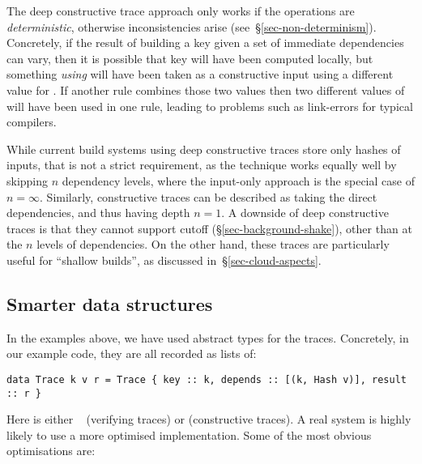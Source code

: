 The deep constructive trace approach only works if the operations are
\emph{deterministic}, otherwise inconsistencies arise
(see~\S\ref{sec-non-determinism}). Concretely, if the result of building a key
given a set of immediate dependencies can vary, then it is possible that key
 will have been computed locally, but something \emph{using}  will
have been taken as a constructive input using a different value for . If
another rule combines those two values then two different values of  will
have been used in one rule, leading to problems such as link-errors for typical
compilers.

While current build systems using deep constructive traces store only hashes of
inputs, that is not a strict requirement, as the technique works equally well by
skipping $n$ dependency levels, where the input-only approach is the special
case of $n = \infty$. Similarly, constructive traces can be described as taking
the direct dependencies, and thus having depth $n = 1$. A downside of deep
constructive traces is that they cannot support cutoff
(\S\ref{sec-background-shake}), other than at the $n$ levels of dependencies. On
the other hand, these traces are particularly useful for ``shallow builds'', as
discussed in~\S\ref{sec-cloud-aspects}.

\subsection{Smarter \hs{[Trace]} data structures}\label{sec-smart-traces}

In the examples above, we have used abstract types for the traces. Concretely, in our example code, they are all recorded as lists of:

\begin{verbatim}
data Trace k v r = Trace { key :: k, depends :: [(k, Hash v)], result :: r }
\end{verbatim}

\noindent
Here  is either ~ (verifying traces) or
 (constructive traces). A real system is highly likely to use a more
optimised implementation. Some of the most obvious optimisations are:

